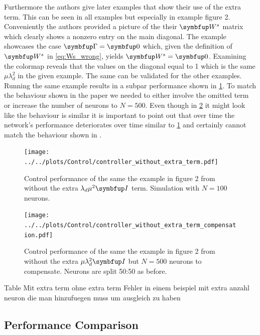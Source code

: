 Furthermore the authors give later examples that show their use of the extra term.
This can be seen in all examples but especially in example figure 2. Conveniently the authors provided a picture of the their $\bmu{W}^s$ matrix which clearly shows a nonzero entry on the main diagonal. The example showcases the case $\bmu{\Gamma} = \bmu{0}$ which, given the definition of $\bmu{W}^s$ in \cref{eq:Ws_wrong}, yields $\bmu{W}^s = \bmu{0}$. Examining the colormap reveals that the values on the diagonal equal to 1 which is the same $\mu\lambda_d^2$ in the given example. The same can be validated for the other examples.\\
Running the same example results in a subpar performance shown in \cref{fig:bad_Ws}. To match the behaviour shown in the paper we needed to either involve the omitted term or increase the number of neurons to $N= 500$. Even though in \cref{fig:bad_Ws_compensated} it might look like the behaviour is similar it is important to point out that over time the network's performance deteriorates over time similar to \cref{fig:bad_Ws} and certainly cannot match the behaviour shown in \cite{huang_optimizing_2017}.
\begin{figure}[h!]
	\centering
	\texttt{[image: ../../plots/Control/controller\_without\_extra\_term.pdf]}
	\caption{Control performance of the same the example in figure 2 from \cite{huang_optimizing_2017} without the extra $\lambda_d\mu^2\bmu{I}$ term. Simulation with $N=100$ neurons.}
	\label{fig:bad_Ws}
\end{figure}


\begin{figure}[h!]
	\centering
	\texttt{[image: ../../plots/Control/controller\_without\_extra\_term\_compensation.pdf]}
	\caption{Control performance of the same the example in figure 2 from \cite{huang_optimizing_2017} without the extra $\mu\lambda_d^2\bmu{I}$ but $N=500$ neurons to compensate. Neurons are split 50:50 as before.}
	\label{fig:bad_Ws_compensated}
\end{figure}


Table
Mit extra term
ohne extra term
 Fehler in einem beispiel mit extra
 anzahl neuron die man hinzufuegen muss um ausgleich zu haben


\subsection{Performance Comparison}

